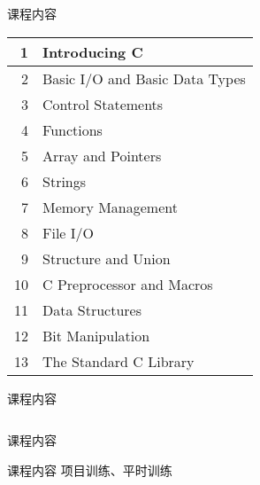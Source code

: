 
\begin{frame}{课程内容}
  \begin{table}[h]
    \centering
    \begin{tabular}{r|l}
      \hline
      1 & Introducing C \\ \hline
      2 & Basic I/O and Basic Data Types \\ \hline
      3 & Control Statements \\ \hline
      4 & Functions \\ \hline
      5 & Array and Pointers \\ \hline
      6 & Strings \\ \hline
      7 & Memory Management \\ \hline
      8 & File I/O \\ \hline
      9 & Structure and Union \\ \hline
      10 & C Preprocessor and Macros \\ \hline
      11 & Data Structures \\ \hline
      12 & Bit Manipulation \\ \hline
      13 & The Standard C Library \\
      \hline
    \end{tabular}
  \end{table}
\end{frame}

\begin{frame}{课程内容}
  \begin{columns}
  \end{columns}
\end{frame}

\begin{frame}{课程内容}
\end{frame}

\begin{frame}{课程内容}
  项目训练、平时训练
\end{frame}
